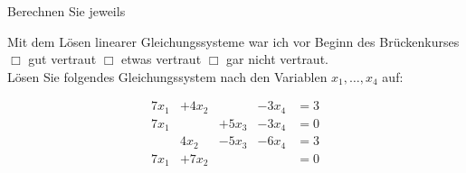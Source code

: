 \documentclass[12pt]{exam}
\begin{document}
\begin{questions}
Berechnen Sie jeweils\\



\pagebreak
{}

Mit dem Lösen linearer Gleichungssysteme war ich vor Beginn des Brückenkurses\\ $\Box$ gut vertraut \hfill $\Box$ etwas vertraut \hfill $\Box$ gar nicht vertraut. \\[2ex]
L\"osen Sie folgendes Gleichungssystem nach den Variablen $x_1,\ldots,x_4$
auf:

\[\begin{array}{rrrrl}
7 x_1 &+ 4 x_2 &~      &-3 x_4 &=3 \\
7 x_1 &~       &+5 x_3 &-3 x_4 &=0 \\
~     &4   x_2 &-5 x_3 &-6 x_4 &=3 \\
7 x_1 &+ 7 x_2 &~      &~      &=0
\end{array}\]
~~\\[20ex]\vfill


\end{questions}
\end{document}
